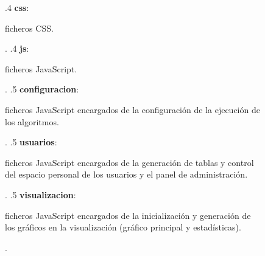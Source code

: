\begin{figure}[H]
{        .4 \textbf{css}: \begin{minipage}[t]{10cm}
            ficheros CSS{.}\\
        \end{minipage}.
        .4 \textbf{js}: \begin{minipage}[t]{10cm}
            ficheros JavaScript{.}\\
        \end{minipage}.
        .5 \textbf{configuracion}: \begin{minipage}[t]{10cm}
            ficheros JavaScript encargados de la configuración de la ejecución de los algoritmos{.}\\
        \end{minipage}.
        .5 \textbf{usuarios}: \begin{minipage}[t]{10cm}
            ficheros JavaScript encargados de la generación de tablas y control del espacio personal de los usuarios y el panel de administración{.}\\
        \end{minipage}.
        .5 \textbf{visualizacion}: \begin{minipage}[t]{6cm}
            ficheros JavaScript encargados de la inicialización y generación de los gráficos en la visualización (gráfico principal y estadísticas){.}\\
        \end{minipage}.
    }
\end{figure}



